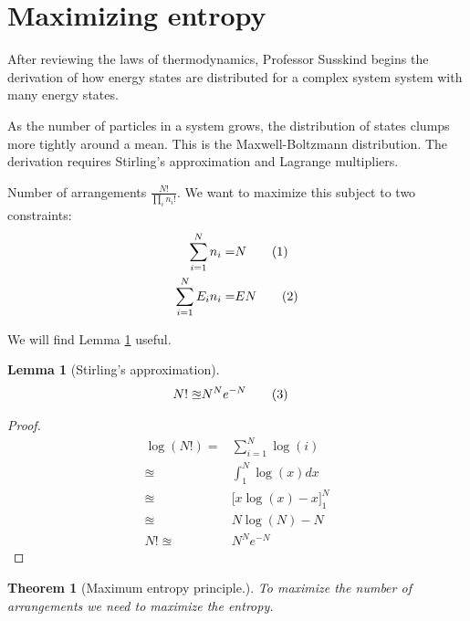 \documentclass[]{article}
\newcommand\numberthis{\addtocounter{equation}{1}\tag{\theequation}}
\newtheorem{thm}{Theorem}
\newtheorem{lemma}{Lemma}
\begin{document}
\section{Maximizing entropy}

After reviewing the laws of thermodynamics, Professor Susskind begins the derivation of how energy states are distributed for a complex system system with many energy states.

As the number of particles in a system grows, the distribution of states clumps more tightly around a mean. This is the Maxwell-Boltzmann distribution. The derivation requires Stirling's approximation and Lagrange multipliers.

Number of arrangements $\frac{N!}{\prod_{i}n_i!}$. We want to maximize this subject to two constraints:
\begin{align*}
\sum_{i=1}^{N} n_i =& N \numberthis\label{eq:sum:probilities}\\
\sum_{i=1}^{N} E_i n_i =& E N \numberthis\label{eq:total:energy}
\end{align*}

We will find Lemma \ref{lemma:Stirling} useful.
\begin{lemma}[Stirling's approximation]\label{lemma:Stirling}
	\begin{align*}
	N! \approxeq& N^N e^{-N}\numberthis\label{eq:stirling}
	\end{align*}
\end{lemma}

\begin{proof}
	\begin{align*}
	\log(N!) =& \sum_{i=1}^{N}\log (i)\\
	\approxeq &\int_{1}^{N} \log(x) dx\\
	\approxeq& \big[x \log(x) - x \big]_1^N\\
	\approxeq& N\log(N)-N\\
	N! \approxeq& N^N e^{-N}
	\end{align*}
\end{proof}	

\begin{thm}[Maximum entropy principle.]
	To maximize the number of arrangements we need to maximize the entropy.
\end{thm}
\end{document}
